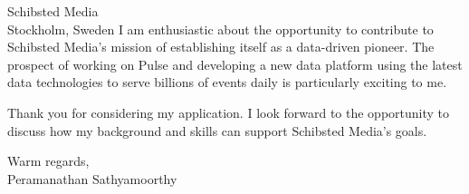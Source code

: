 \documentclass{letter}
\begin{document}
\begin{letter}{Schibsted Media\\
Stockholm, Sweden}
I am enthusiastic about the opportunity to contribute to Schibsted Media's mission of establishing itself as a data-driven pioneer. The prospect of working on Pulse and developing a new data platform using the latest data technologies to serve billions of events daily is particularly exciting to me.

Thank you for considering my application. I look forward to the opportunity to discuss how my background and skills can support Schibsted Media's goals.

\closing{Warm regards,\\[2ex]
Peramanathan Sathyamoorthy}

\end{letter}
\end{document}

